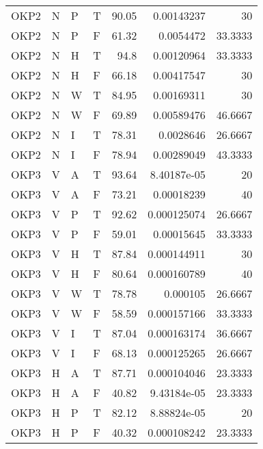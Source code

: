 \begin{longtable}{llllrrr}
    OKP2     & N     & P     & T          & 90.05      & 0.00143237  & 30       \\
    OKP2     & N     & P     & F          & 61.32      & 0.0054472   & 33.3333  \\
    OKP2     & N     & H     & T          & 94.8       & 0.00120964  & 33.3333  \\
    OKP2     & N     & H     & F          & 66.18      & 0.00417547  & 30       \\
    OKP2     & N     & W     & T          & 84.95      & 0.00169311  & 30       \\
    OKP2     & N     & W     & F          & 69.89      & 0.00589476  & 46.6667  \\
    OKP2     & N     & I     & T          & 78.31      & 0.0028646   & 26.6667  \\
    OKP2     & N     & I     & F          & 78.94      & 0.00289049  & 43.3333  \\
    OKP3     & V     & A     & T          & 93.64      & 8.40187e-05 & 20       \\
    OKP3     & V     & A     & F          & 73.21      & 0.00018239  & 40       \\
    OKP3     & V     & P     & T          & 92.62      & 0.000125074 & 26.6667  \\
    OKP3     & V     & P     & F          & 59.01      & 0.00015645  & 33.3333  \\
    OKP3     & V     & H     & T          & 87.84      & 0.000144911 & 30       \\
    OKP3     & V     & H     & F          & 80.64      & 0.000160789 & 40       \\
    OKP3     & V     & W     & T          & 78.78      & 0.000105    & 26.6667  \\
    OKP3     & V     & W     & F          & 58.59      & 0.000157166 & 33.3333  \\
    OKP3     & V     & I     & T          & 87.04      & 0.000163174 & 36.6667  \\
    OKP3     & V     & I     & F          & 68.13      & 0.000125265 & 26.6667  \\
    OKP3     & H     & A     & T          & 87.71      & 0.000104046 & 23.3333  \\
    OKP3     & H     & A     & F          & 40.82      & 9.43184e-05 & 23.3333  \\
    OKP3     & H     & P     & T          & 82.12      & 8.88824e-05 & 20       \\
    OKP3     & H     & P     & F          & 40.32      & 0.000108242 & 23.3333  \\

\end{longtable}
